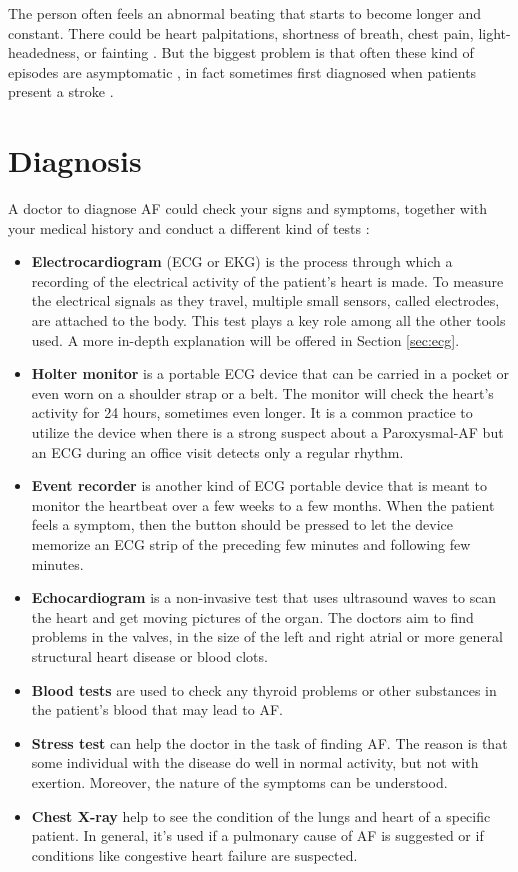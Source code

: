The person often feels an abnormal beating that starts to become longer and constant. There could be heart palpitations, shortness of breath, chest pain,  light-headedness, or fainting \cite{chamberlain_gray_houghton_2010}. But the biggest problem is that often these kind of episodes are asymptomatic \cite{Munger2014}, in fact sometimes first diagnosed when patients present a stroke \cite{page2003asymptomatic}.

\section{Diagnosis}
\label{af_diagnosis}
A doctor to diagnose AF could check your signs and symptoms, together with your medical history and conduct a different kind of tests \cite{mayo_clinic_2019}:
\begin{itemize}
\item \textbf{Electrocardiogram} (ECG or EKG) is the process through which a recording of the electrical activity of the patient's heart is made. To measure the electrical signals as they travel, multiple small sensors, called electrodes, are attached to the body. This test plays a key role among all the other tools used. A more in-depth explanation will be offered in Section \ref{sec:ecg}.
\item \textbf{Holter monitor} is a portable ECG device that can be carried in a pocket or even worn on a shoulder strap or a belt. The monitor will check the heart's activity for 24 hours, sometimes even longer. It is a common practice to utilize the device when there is a strong suspect about a Paroxysmal-AF but an ECG during an office visit detects only a regular rhythm.
\item \textbf{Event recorder} is another kind of ECG portable device that is meant to monitor the heartbeat over a few weeks to a few months. When the patient feels a symptom, then the button should be pressed to let the device memorize an ECG strip of the preceding few minutes and following few minutes.
\item \textbf{Echocardiogram} is a non-invasive test that uses ultrasound waves to scan the heart and get moving pictures of the organ. The doctors aim to find problems in the valves, in the size of the left and right atrial or more general structural heart disease or blood clots.
\item \textbf{Blood tests} are used to check any thyroid problems or other substances in the patient's blood that may lead to AF.
\item \textbf{Stress test} can help the doctor in the task of finding AF. The reason is that some individual with the disease do well in normal activity, but not with exertion. Moreover, the nature of the symptoms can be understood.
\item \textbf{Chest X-ray} help to see the condition of the lungs and heart of a specific patient. In general, it's used if a pulmonary cause of AF is suggested or if conditions like congestive heart failure are suspected.
\end{itemize}

